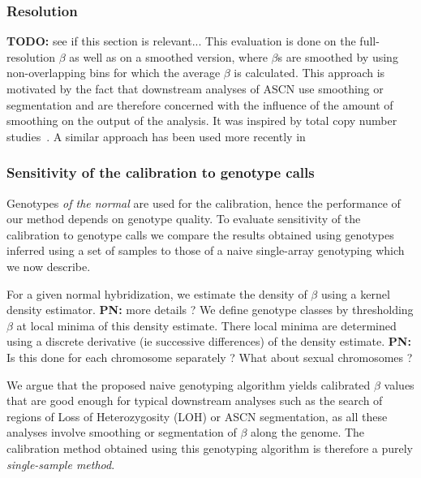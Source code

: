 \documentclass[10pt]{bmc_article}
\newenvironment{bmcformat}{\fussy\setboolean{publ}{true}}{\fussy}
\newenvironment{TODO}{\color{red}\textbf{TODO:}}{}
\newenvironment{PN}{\color{blue}\textbf{PN:}}{}
\begin{document}
\begin{bmcformat}
\subsubsection*{Resolution}
\begin{TODO}
  see if this section is relevant...
\end{TODO}
This evaluation is done on the full-resolution $\beta$ as well as on a smoothed 
version, where $\beta$s are smoothed by using non-overlapping bins 
for which the average $\beta$ is calculated. This approach is motivated by the fact that downstream analyses of ASCN use smoothing or segmentation and are therefore concerned with the influence of the amount of smoothing on the output of the analysis. It was inspired 
by total copy number studies~\cite{LaiW_etal_2005,WillenbrockFridlyand_2005}. A similar approach has been used more recently in~\cite{BengtssonH_etal_2009b,BengtssonH_etal_2008}

\subsubsection*{Sensitivity of the calibration to genotype calls}
Genotypes \emph{of the normal} are used for the calibration, hence the performance of our method depends on genotype quality. To evaluate sensitivity of the calibration to genotype calls we compare the results obtained using genotypes inferred using a set of samples to those of a naive single-array genotyping which we now describe.

For a given normal hybridization, we estimate the density of $\beta$ using a kernel density estimator.
\begin{PN}
  more details ?
\end{PN}
We define genotype classes by thresholding $\beta$ at local minima of this density estimate. There local minima are determined using a discrete derivative (ie successive differences) of the density estimate. 
\begin{PN}
Is this done for each chromosome separately ? What about sexual chromosomes ? 
\end{PN}

We argue that the proposed naive genotyping algorithm yields calibrated $\beta$ values that are good enough for typical downstream analyses such as the search of regions of Loss of Heterozygosity (LOH) or ASCN segmentation, as all these analyses  involve smoothing or segmentation of $\beta$ along the genome. The calibration method obtained using this genotyping algorithm is therefore a purely \emph{single-sample method}.


\end{bmcformat}
\end{document}
